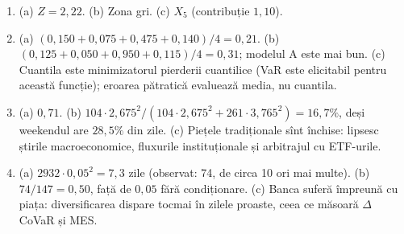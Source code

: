 \documentclass[10.5pt]{article}
\begin{document}
{\begin{enumerate}[label=\textbf{\arabic*.},leftmargin=2.2em,itemsep=0.25ex]
\item (a) $Z=2{,}22$. (b) Zona gri. (c) $X_5$ (contribuție $1{,}10$).
\item (a) $(0{,}150+0{,}075+0{,}475+0{,}140)/4=0{,}21$. (b) $(0{,}125+0{,}050+0{,}950+0{,}115)/4=0{,}31$; modelul A
este mai bun. (c) Cuantila este minimizatorul pierderii cuantilice (VaR este elicitabil pentru această funcție);
eroarea pătratică evaluează media, nu cuantila.
\item (a) $0{,}71$. (b) $104\cdot 2{,}675^2/(104\cdot 2{,}675^2+261\cdot 3{,}765^2)=16{,}7\%$, deși weekendul are
$28{,}5\%$ din zile. (c) Piețele tradiționale sînt închise: lipsesc știrile macroeconomice, fluxurile instituționale
și arbitrajul cu ETF-urile.
\item (a) $2932\cdot 0{,}05^2=7{,}3$ zile (observat: 74, de circa 10 ori mai multe). (b) $74/147=0{,}50$, față de
$0{,}05$ fără condiționare. (c) Banca suferă împreună cu piața: diversificarea dispare tocmai în zilele proaste,
ceea ce măsoară $\Delta$CoVaR și MES.
\end{enumerate}}
\end{document}
